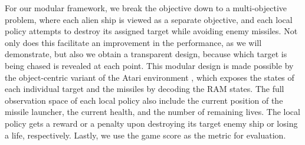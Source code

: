 For our modular framework, we break the objective down to a multi-objective problem, where each alien ship is viewed as a separate objective, and each local policy attempts to destroy its assigned target while avoiding enemy missiles. 
Not only does this facilitate an improvement in the performance, as we will demonstrate, but also we obtain a transparent design, because which target is being chased is revealed at each point. 
This modular design is made possible by the object-centric variant of the Atari environment \citep{delfosse2023ocatari}, which exposes the states of each individual target and the missiles by decoding the RAM states. 
The full observation space of each local policy also include the current position of the missile launcher, the current health, and the number of remaining lives. 
The local policy gets a reward or a penalty upon destroying its target enemy ship or losing a life, respectively. 
Lastly, we use the game score as the metric for evaluation.

%

